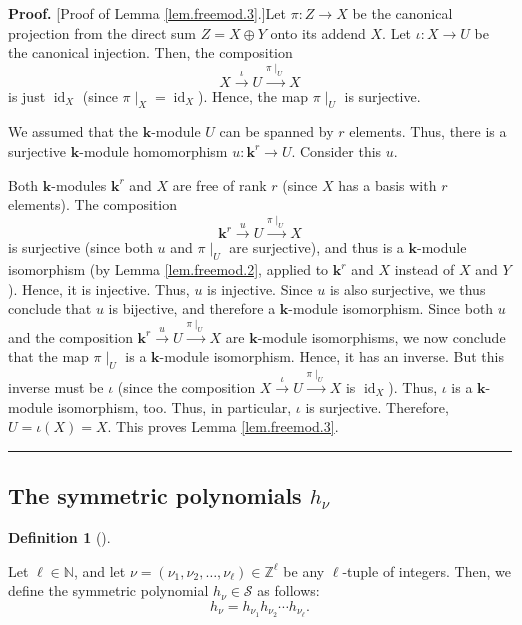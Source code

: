 \documentclass[numbers=enddot,12pt,final,onecolumn,notitlepage]{scrartcl}%
\theoremstyle{definition}
\newtheorem{defi}[theo]{Definition}
\newenvironment{definition}[1][]
{\begin{defi}[#1]\begin{leftbar}}
{\end{leftbar}\end{defi}}
\newenvironment{proof}[1][Proof]{\noindent\textbf{#1.} }{\ \rule{0.5em}{0.5em}}
\begin{document}
\begin{proof}
[Proof of Lemma \ref{lem.freemod.3}.]Let $\pi:Z\rightarrow X$ be the canonical
projection from the direct sum $Z=X\oplus Y$ onto its addend $X$. Let
$\iota:X\rightarrow U$ be the canonical injection. Then, the composition%
\[
X\overset{\iota}{\longrightarrow}U\overset{\pi\mid_{U}}{\longrightarrow}X
\]
is just $\operatorname*{id}\nolimits_{X}$ (since $\pi\mid_{X}%
=\operatorname*{id}\nolimits_{X}$). Hence, the map $\pi\mid_{U}$ is surjective.

We assumed that the $\mathbf{k}$-module $U$ can be spanned by $r$ elements.
Thus, there is a surjective $\mathbf{k}$-module homomorphism $u:\mathbf{k}%
^{r}\rightarrow U$. Consider this $u$.

Both $\mathbf{k}$-modules $\mathbf{k}^{r}$ and $X$ are free of rank $r$ (since
$X$ has a basis with $r$ elements). The composition
\[
\mathbf{k}^{r}\overset{u}{\longrightarrow}U\overset{\pi\mid_{U}%
}{\longrightarrow}X
\]
is surjective (since both $u$ and $\pi\mid_{U}$ are surjective), and thus is a
$\mathbf{k}$-module isomorphism (by Lemma \ref{lem.freemod.2}, applied to
$\mathbf{k}^{r}$ and $X$ instead of $X$ and $Y$). Hence, it is injective.
Thus, $u$ is injective. Since $u$ is also surjective, we thus conclude that
$u$ is bijective, and therefore a $\mathbf{k}$-module isomorphism. Since both
$u$ and the composition $\mathbf{k}^{r}\overset{u}{\longrightarrow
}U\overset{\pi\mid_{U}}{\longrightarrow}X$ are $\mathbf{k}$-module
isomorphisms, we now conclude that the map $\pi\mid_{U}$ is a $\mathbf{k}%
$-module isomorphism. Hence, it has an inverse. But this inverse must be
$\iota$ (since the composition $X\overset{\iota}{\longrightarrow}%
U\overset{\pi\mid_{U}}{\longrightarrow}X$ is $\operatorname*{id}\nolimits_{X}%
$). Thus, $\iota$ is a $\mathbf{k}$-module isomorphism, too. Thus, in
particular, $\iota$ is surjective. Therefore, $U=\iota\left(  X\right)  =X$.
This proves Lemma \ref{lem.freemod.3}.
\end{proof}

\subsection{The symmetric polynomials $h_{\nu}$}

\begin{definition}
Let $\ell\in\mathbb{N}$, and let $\nu=\left(  \nu_{1},\nu_{2},\ldots,\nu
_{\ell}\right)  \in\mathbb{Z}^{\ell}$ be any $\ell$-tuple of integers. Then,
we define the symmetric polynomial $h_{\nu}\in\mathcal{S}$ as follows:%
\[
h_{\nu}=h_{\nu_{1}}h_{\nu_{2}}\cdots h_{\nu_{\ell}}.
\]

\end{definition}
\end{document}
